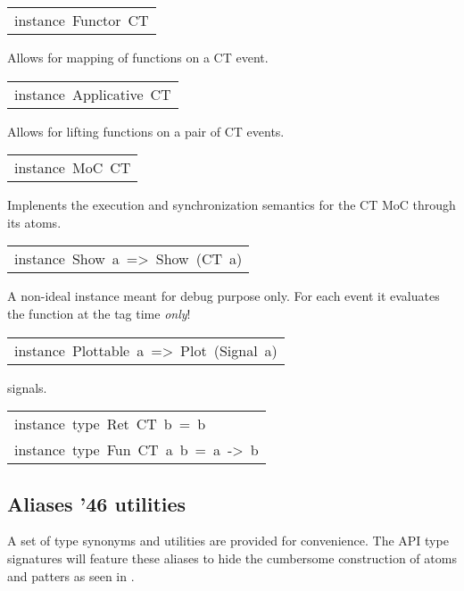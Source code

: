 \begin{haddockdesc}
\item[\begin{tabular}{@{}l}
instance\ Functor\ CT
\end{tabular}]\haddockbegindoc
Allows for mapping of functions on a CT event.\par


\item[\begin{tabular}{@{}l}
instance\ Applicative\ CT
\end{tabular}]\haddockbegindoc
Allows for lifting functions on a pair of CT events.\par


\item[\begin{tabular}{@{}l}
instance\ MoC\ CT
\end{tabular}]\haddockbegindoc
Implenents the execution and synchronization semantics for the CT
 MoC through its atoms.\par


\item[\begin{tabular}{@{}l}
instance\ Show\ a\ =>\ Show\ (CT\ a)
\end{tabular}]\haddockbegindoc
A non-ideal instance meant for debug purpose only. For each event
 it evaluates the function at the tag time \emph{only}!\par


\item[\begin{tabular}{@{}l}
instance\ Plottable\ a\ =>\ Plot\ (Signal\ a)
\end{tabular}]\haddockbegindoc
{} signals.\par


\item[\begin{tabular}{@{}l}
instance\ type\ Ret\ CT\ b\ =\ b\\instance\ type\ Fun\ CT\ a\ b\ =\ a\ ->\ b
\end{tabular}]
\end{haddockdesc}
\subsection{Aliases {\char '46} utilities}
A set of type synonyms and utilities are provided for
 convenience. The API type signatures will feature these aliases
 to hide the cumbersome construction of atoms and patters as seen
 in .\par

